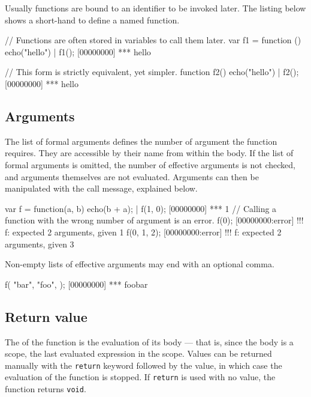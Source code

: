Usually functions are bound to an identifier to be invoked later.
The listing below shows a short-hand to define a named
function.

\begin{urbiscript}
// Functions are often stored in variables to call them later.
var f1 = function () {
  echo("hello")
}|
f1();
[00000000] *** hello

// This form is strictly equivalent, yet simpler.
function f2()
{
  echo("hello")
}|
f2();
[00000000] *** hello
\end{urbiscript}


\subsection{Arguments}

The list of formal arguments defines the number of argument the
function requires. They are accessible by their name from within the
body. If the list of formal arguments is omitted, the number of
effective arguments is not checked, and arguments themselves are not
evaluated. Arguments can then be manipulated with the call message,
explained below.

\begin{urbiscript}
var f = function(a, b) {
  echo(b + a);
}|
f(1, 0);
[00000000] *** 1
// Calling a function with the wrong number of argument is an error.
f(0);
[00000000:error] !!! f: expected 2 arguments, given 1
f(0, 1, 2);
[00000000:error] !!! f: expected 2 arguments, given 3
\end{urbiscript}

Non-empty lists of effective arguments may end with an optional comma.
\begin{urbiscript}
f(
  "bar",
  "foo",
 );
[00000000] *** foobar
\end{urbiscript}


\subsection{Return value}

The  of the function is the
evaluation of its body --- that is, since the body is a scope, the
last evaluated expression in the scope.  Values can be returned
manually with the \lstinline|return| keyword followed by the value, in
which case the evaluation of the function is stopped. If
\lstinline|return| is used with no value, the function returns
\lstinline|void|.

